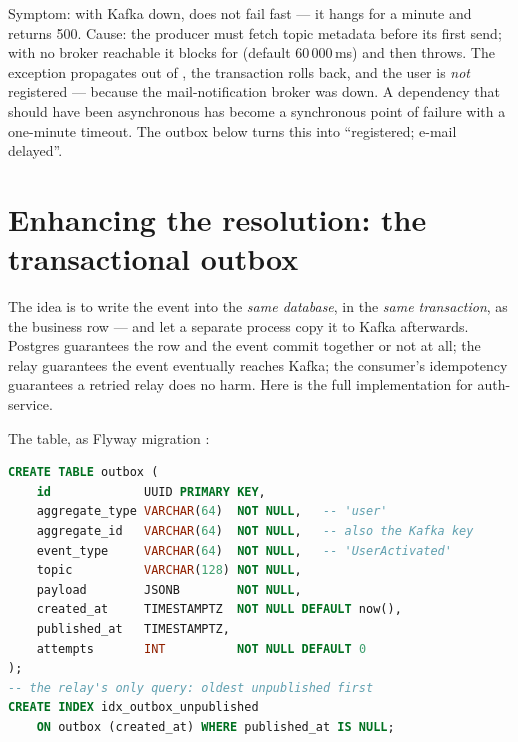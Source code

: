 \begin{pitfall}
Symptom: with Kafka down,  does not fail
fast --- it hangs for a minute and returns 500. Cause: the producer must
fetch topic metadata before its first send; with no broker reachable it
blocks for  (default 60\,000\,ms) and then throws.
The exception propagates out of , the transaction
rolls back, and the user is \emph{not} registered --- because the
mail-notification broker was down. A dependency that should have been
asynchronous has become a synchronous point of failure with a one-minute
timeout. The outbox below turns this into ``registered; e-mail delayed''.
\end{pitfall}


\section{Enhancing the resolution: the transactional outbox}
\label{sec:enhancing-outbox}

The idea is to write the event into the \emph{same database}, in the
\emph{same transaction}, as the business row --- and let a separate
process copy it to Kafka afterwards. Postgres guarantees the row and the
event commit together or not at all; the relay guarantees the event
eventually reaches Kafka; the consumer's idempotency guarantees a
retried relay does no harm. Here is the full implementation for
auth-service.

The table, as Flyway migration :

\begin{lstlisting}[language=SQL]
CREATE TABLE outbox (
    id             UUID PRIMARY KEY,
    aggregate_type VARCHAR(64)  NOT NULL,   -- 'user'
    aggregate_id   VARCHAR(64)  NOT NULL,   -- also the Kafka key
    event_type     VARCHAR(64)  NOT NULL,   -- 'UserActivated'
    topic          VARCHAR(128) NOT NULL,
    payload        JSONB        NOT NULL,
    created_at     TIMESTAMPTZ  NOT NULL DEFAULT now(),
    published_at   TIMESTAMPTZ,
    attempts       INT          NOT NULL DEFAULT 0
);
-- the relay's only query: oldest unpublished first
CREATE INDEX idx_outbox_unpublished
    ON outbox (created_at) WHERE published_at IS NULL;
\end{lstlisting}

